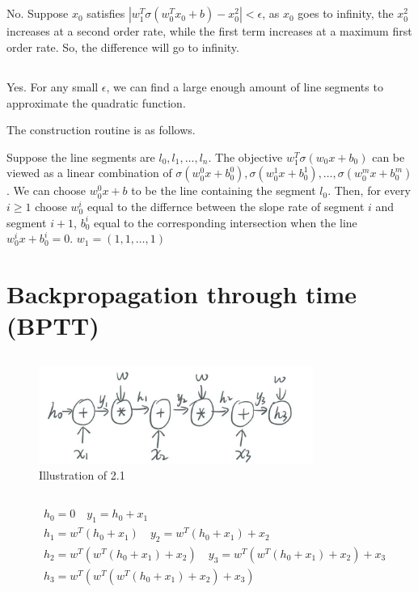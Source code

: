 \documentclass[12pt]{article}
\begin{document}
\subsection{}
No. Suppose $x_{0}$ satisfies $|w_1^T\sigma(w_0^T x_0 + b) - x_0^2| < \epsilon$, as $x_{0}$ goes to infinity, the $x_0^2$ increases at a second order rate, while the first term increases at a maximum first order rate. So, the difference will go to infinity.

\subsection{}
Yes. For any small $\epsilon$, we can find a large enough amount of line segments to approximate the quadratic function. 

The construction routine is as follows.

Suppose the line segments are $l_0, l_1, \dots, l_n$. The objective $w_1^T \sigma(w_0 x + b_0)$ can be viewed as a linear combination of $\sigma(w_0^0 x + b_0^0), \sigma(w_0^1 x + b_0^1), \dots, \sigma(w_0^m x + b_0^m)$.
We can choose $w_0^0 x + b$ to be the line containing the segment $l_0$. Then, for every $i \ge 1$ choose $w_0^i$ equal to the differnce between the slope rate of segment $i$ and segment $i+1$, $b_0^i$ equal to the corresponding intersection when the line $w_0^i x + b_0^i = 0$. $w_1 = (1, 1, \dots, 1)$
\newpage

\section{Backpropagation through time (BPTT)}
\subsection{}
\begin{figure}[h]
    \centering
    \includegraphics[width=0.8\textwidth]{imgs/2-1.jpg}
    \caption{Illustration of 2.1}
    \label{fig:2-1}
\end{figure}

\subsection{}
\begin{align}
    &h_0 = 0 \quad y_1 = h_0 + x_1 \nonumber  \\
    &h_1 = w^T (h_0 + x_1) \quad  y_2 = w^T(h_0 + x_1) + x_2 \nonumber  \\
    &h_2 = w^T(w^T(h_0 + x_1) + x_2) \quad  y_3 = w^T(w^T(h_0 + x_1) + x_2) + x_3 \nonumber  \\
    &h_3 = w^T(w^T(w^T(h_0 + x_1) + x_2) + x_3) \quad \nonumber
\end{align}
\end{document}
